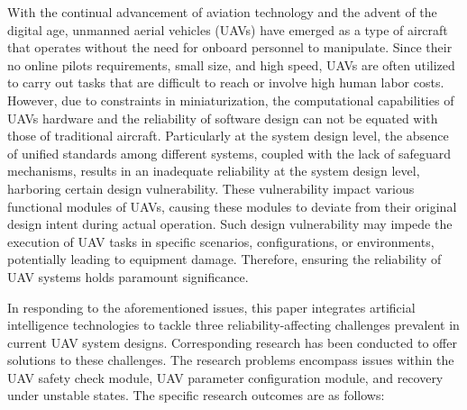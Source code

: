 With the continual advancement of aviation technology and the advent of the digital age, unmanned aerial vehicles (UAVs) have emerged as a type of aircraft that operates without the need for onboard personnel to manipulate.
Since their no online pilots requirements,  small size, and high speed, UAVs are often utilized to carry out tasks that are difficult to reach or involve high human labor costs.
However, due to constraints in miniaturization, the computational capabilities of UAVs hardware and the reliability of software design can not be equated with those of traditional aircraft. 
Particularly at the system design level, the absence of unified standards among different systems, coupled with the lack of safeguard mechanisms, results in an inadequate reliability at the system design level, harboring certain design vulnerability. 
These vulnerability impact various functional modules of UAVs, causing these modules to deviate from their original design intent during actual operation. 
Such design vulnerability may impede the execution of UAV tasks in specific scenarios, configurations, or environments, potentially leading to equipment damage. 
Therefore, ensuring the reliability of UAV systems holds paramount significance.

In responding to the aforementioned issues, this paper integrates artificial intelligence technologies to tackle three reliability-affecting challenges prevalent in current UAV system designs. 
Corresponding research has been conducted to offer solutions to these challenges. 
The research problems encompass issues within the UAV safety check module, UAV parameter configuration module, and recovery under unstable states.
The specific research outcomes are as follows:


